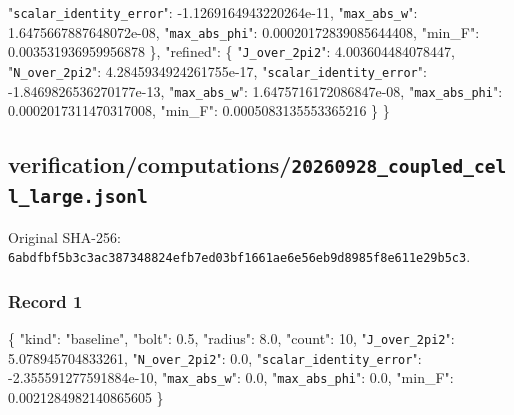 \documentclass[
  10pt,
]{article}
\newenvironment{Shaded}{}{}
\newcommand{\DataTypeTok}[1]{\textcolor[rgb]{0.56,0.13,0.00}{#1}}
\newcommand{\DecValTok}[1]{\textcolor[rgb]{0.25,0.63,0.44}{#1}}
\newcommand{\FloatTok}[1]{\textcolor[rgb]{0.25,0.63,0.44}{#1}}
\newcommand{\FunctionTok}[1]{\textcolor[rgb]{0.02,0.16,0.49}{#1}}
\newcommand{\StringTok}[1]{\textcolor[rgb]{0.25,0.44,0.63}{#1}}
\begin{document}
\begin{Shaded}
\begin{Highlighting}[]
    \DataTypeTok{"\nolinkurl{scalar_identity_error}"}\FunctionTok{:} \FloatTok{{-}1.1269164943220264e{-}11}\FunctionTok{,}
    \DataTypeTok{"\nolinkurl{max_abs_w}"}\FunctionTok{:} \FloatTok{1.6475667887648072e{-}08}\FunctionTok{,}
    \DataTypeTok{"\nolinkurl{max_abs_phi}"}\FunctionTok{:} \FloatTok{0.00020172839085644408}\FunctionTok{,}
    \DataTypeTok{"min\_F"}\FunctionTok{:} \FloatTok{0.003531936959956878}
  \FunctionTok{\},}
  \DataTypeTok{"refined"}\FunctionTok{:} \FunctionTok{\{}
    \DataTypeTok{"\nolinkurl{J_over_2pi2}"}\FunctionTok{:} \FloatTok{4.003604484078447}\FunctionTok{,}
    \DataTypeTok{"\nolinkurl{N_over_2pi2}"}\FunctionTok{:} \FloatTok{4.2845934924261755e{-}17}\FunctionTok{,}
    \DataTypeTok{"\nolinkurl{scalar_identity_error}"}\FunctionTok{:} \FloatTok{{-}1.8469826536270177e{-}13}\FunctionTok{,}
    \DataTypeTok{"\nolinkurl{max_abs_w}"}\FunctionTok{:} \FloatTok{1.6475716172086847e{-}08}\FunctionTok{,}
    \DataTypeTok{"\nolinkurl{max_abs_phi}"}\FunctionTok{:} \FloatTok{0.0002017311470317008}\FunctionTok{,}
    \DataTypeTok{"min\_F"}\FunctionTok{:} \FloatTok{0.0005083135553365216}
  \FunctionTok{\}}
\FunctionTok{\}}
\end{Highlighting}
\end{Shaded}

\hypertarget{verificationcomputations20260928_coupled_cell_large.jsonl}{%
\subsection{verification/computations/\nolinkurl{20260928_coupled_cell_large.jsonl}}\label{verificationcomputations20260928_coupled_cell_large.jsonl}}

Original SHA-256:
\nolinkurl{6abdfbf5b3c3ac387348824efb7ed03bf1661ae6e56eb9d8985f8e611e29b5c3}.

\hypertarget{record-1-3}{%
\subsubsection{Record 1}\label{record-1-3}}

\begin{Shaded}
\begin{Highlighting}[]
\FunctionTok{\{}
  \DataTypeTok{"kind"}\FunctionTok{:} \StringTok{"baseline"}\FunctionTok{,}
  \DataTypeTok{"bolt"}\FunctionTok{:} \FloatTok{0.5}\FunctionTok{,}
  \DataTypeTok{"radius"}\FunctionTok{:} \FloatTok{8.0}\FunctionTok{,}
  \DataTypeTok{"count"}\FunctionTok{:} \DecValTok{10}\FunctionTok{,}
  \DataTypeTok{"\nolinkurl{J_over_2pi2}"}\FunctionTok{:} \FloatTok{5.078945704833261}\FunctionTok{,}
  \DataTypeTok{"\nolinkurl{N_over_2pi2}"}\FunctionTok{:} \FloatTok{0.0}\FunctionTok{,}
  \DataTypeTok{"\nolinkurl{scalar_identity_error}"}\FunctionTok{:} \FloatTok{{-}2.355591277591884e{-}10}\FunctionTok{,}
  \DataTypeTok{"\nolinkurl{max_abs_w}"}\FunctionTok{:} \FloatTok{0.0}\FunctionTok{,}
  \DataTypeTok{"\nolinkurl{max_abs_phi}"}\FunctionTok{:} \FloatTok{0.0}\FunctionTok{,}
  \DataTypeTok{"min\_F"}\FunctionTok{:} \FloatTok{0.0021284982140865605}
\FunctionTok{\}}
\end{Highlighting}
\end{Shaded}
\end{document}
